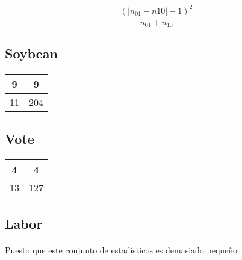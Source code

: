 \documentclass[10pt, a4paper,spanish]{article}
\begin{document}
		\[
		\frac{(|n_{01}-n{10}|-1)^2}{n_{01}+n_{10}}
		\]


		\subsection{Soybean}

			\paragraph{}

			\paragraph{}
			\begin{center}
				\begin{tabular}{ | c | c | }
					\hline
					9 & 9 \\ \hline
					11 & 204 \\
					\hline
				\end{tabular}
			\end{center}


		\subsection{Vote}

			\paragraph{}

			\paragraph{}
			\begin{center}
				\begin{tabular}{ | c | c | }
					\hline
					4 & 4 \\ \hline
					13 & 127 \\
					\hline
				\end{tabular}
			\end{center}

		\subsection{Labor}

			\paragraph{}
			Puesto que este conjunto de estadísticos es demasiado pequeño
\end{document}
